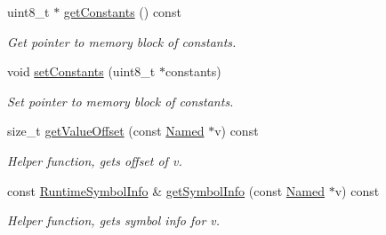 \begin{DoxyCompactItemize}
\mbox{\label{classglow_1_1runtime_1_1_runtime_bundle_a7c080dc9d43996462e5ec18e7b1a5c80}} 
uint8\+\_\+t $\ast$ \hyperlink{classglow_1_1runtime_1_1_runtime_bundle_a7c080dc9d43996462e5ec18e7b1a5c80}{get\+Constants} () const
\begin{DoxyCompactList}\small\item\em Get pointer to memory block of constants. \end{DoxyCompactList}\item 
\mbox{\label{classglow_1_1runtime_1_1_runtime_bundle_af96a025bdc7c79ad0c4ee4269d2b9698}} 
void \hyperlink{classglow_1_1runtime_1_1_runtime_bundle_af96a025bdc7c79ad0c4ee4269d2b9698}{set\+Constants} (uint8\+\_\+t $\ast$constants)
\begin{DoxyCompactList}\small\item\em Set pointer to memory block of constants. \end{DoxyCompactList}\item 
\mbox{\label{classglow_1_1runtime_1_1_runtime_bundle_a8b3bfb661c9a4d70ada436f5322a04fe}} 
size\+\_\+t \hyperlink{classglow_1_1runtime_1_1_runtime_bundle_a8b3bfb661c9a4d70ada436f5322a04fe}{get\+Value\+Offset} (const \hyperlink{classglow_1_1_named}{Named} $\ast$v) const
\begin{DoxyCompactList}\small\item\em Helper function, gets offset of {\ttfamily v}. \end{DoxyCompactList}\item 
\mbox{\label{classglow_1_1runtime_1_1_runtime_bundle_a4390c9f31d556ea14b4108a5655e688e}} 
const \hyperlink{structglow_1_1runtime_1_1_runtime_symbol_info}{Runtime\+Symbol\+Info} \& \hyperlink{classglow_1_1runtime_1_1_runtime_bundle_a4390c9f31d556ea14b4108a5655e688e}{get\+Symbol\+Info} (const \hyperlink{classglow_1_1_named}{Named} $\ast$v) const
\begin{DoxyCompactList}\small\item\em Helper function, gets symbol info for {\ttfamily v}. \end{DoxyCompactList}\item 
\mbox{\label{classglow_1_1runtime_1_1_runtime_bundle_a29fce3fb1bbb1bf761366d6e03c24dc9}} 

\end{DoxyCompactItemize}
